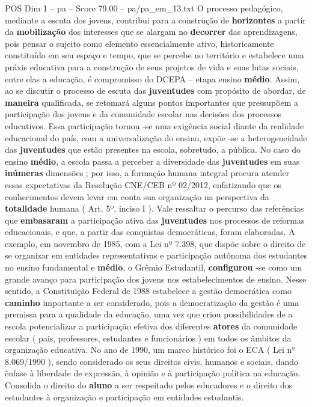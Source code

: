 \begin{textsample}{POS Dim 1 – pa – Score 79.00 – pa/pa\_em\_13.txt}
O processo pedagógico, mediante a escuta dos jovens, contribui para a construção de \textbf{horizontes} a partir da \textbf{mobilização} dos interesses que se alargam no \textbf{decorrer} das aprendizagens, pois pensar o sujeito como elemento essencialmente ativo, historicamente constituído em seu espaço e tempo, que se percebe no território e estabelece uma práxis educativa para a construção de seus projetos de vida e suas lutas sociais, entre elas a educação, é compromisso do DCEPA – etapa ensino \textbf{médio}.
Assim, ao se discutir o processo de escuta das \textbf{juventudes} com propósito de abordar, de \textbf{maneira} qualificada, se retomará alguns pontos importantes que pressupõem a participação dos jovens e da comunidade escolar nas decisões dos processos educativos.
Essa participação tornou -se uma exigência social diante da realidade educacional do país, com a universalização do ensino, expõe -se a heterogeneidade das \textbf{juventudes} que estão presentes na escola, sobretudo, a pública.
No caso do ensino \textbf{médio}, a escola passa a perceber a diversidade das \textbf{juventudes} em suas \textbf{inúmeras} dimensões ; por isso, a formação humana integral procura atender essas expectativas da Resolução CNE/CEB nº 02/2012, enfatizando que os conhecimentos devem levar em conta sua organização na perspectiva da \textbf{totalidade} humana ( Art. 5º, inciso I ).
Vale ressaltar o percurso das referências que \textbf{embasaram} a participação ativa das \textbf{juventudes} nos processos de reformas educacionais, e que, a partir das conquistas democráticas, foram elaboradas.
A exemplo, em novembro de 1985, com a Lei nº 7.398, que dispõe sobre o direito de se organizar em entidades representativas e participação autônoma dos estudantes no ensino fundamental e \textbf{médio}, o Grêmio Estudantil, \textbf{configurou} -se como um grande avanço para participação dos jovens nos estabelecimentos de ensino.
Nesse sentido, a Constituição Federal de 1988 estabelece a gestão democrática como \textbf{caminho} importante a ser considerado, pois a democratização da gestão é uma premissa para a qualidade da educação, uma vez que criou possibilidades de a escola potencializar a participação efetiva dos diferentes \textbf{atores} da comunidade escolar ( pais, professores, estudantes e funcionários ) em todos os âmbitos da organização educativa.
No ano de 1990, um marco histórico foi o ECA ( Lei nº 8.069/1990 ), sendo considerado os seus direitos civis, humanos e sociais, dando ênfase à liberdade de expressão, à opinião e à participação política na educação.
Consolida o direito do \textbf{aluno} a ser respeitado pelos educadores e o direito dos estudantes à organização e participação em entidades estudantis.

\end{textsample}
